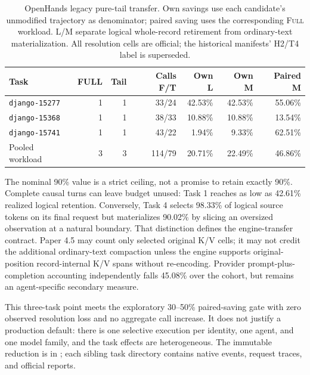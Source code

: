 \documentclass[11pt]{article}
\begin{document}
\begin{table}[H]
\centering
\scriptsize
\caption{OpenHands legacy pure-tail transfer. Own savings use each candidate's
unmodified trajectory as denominator; paired saving uses the corresponding
\textsc{Full} workload. L/M separate logical whole-record retirement from
ordinary-text materialization. All resolution cells are official; the
historical manifests' H2/T4 label is superseded.}
\label{tab:openhands-tail90}
\begin{tabular}{lrrrrrr}
\toprule
Task & FULL & Tail & Calls F/T & Own L & Own M & Paired M \\
\midrule
\texttt{django-15277} & 1 & 1 & 33/24 & 42.53\% & 42.53\% & 55.06\% \\
\texttt{django-15368} & 1 & 1 & 38/33 & 10.88\% & 10.88\% & 13.54\% \\
\texttt{django-15741} & 1 & 1 & 43/22 & 1.94\% & 9.33\% & 62.51\% \\
\midrule
Pooled workload & 3 & 3 & 114/79 & 20.71\% & 22.49\% & 46.86\% \\
\bottomrule
\end{tabular}
\end{table}

The nominal 90\% value is a strict ceiling, not a promise to retain exactly
90\%.  Complete causal turns can leave budget unused: Task 1 reaches as low as
42.61\% realized logical retention.  Conversely, Task 4 selects 98.33\% of
logical source tokens on its final request but materializes 90.02\% by slicing
an oversized observation at a natural boundary.  That distinction defines the
engine-transfer contract.  Paper 4.5 may count only selected original K/V
cells; it may not credit the additional ordinary-text compaction unless the
engine supports original-position record-internal K/V spans without
re-encoding.  Provider prompt-plus-completion accounting independently falls
45.08\% over the cohort, but remains an agent-specific secondary measure.

This three-task point meets the exploratory 30--50\% paired-saving gate with
zero observed resolution loss and no aggregate call increase.  It does not
justify a production default: there is one selective execution per identity,
one agent, and one model family, and the task effects are heterogeneous.  The
immutable reduction is in
; each sibling
task directory contains native events, request traces, and official reports.
\end{document}
